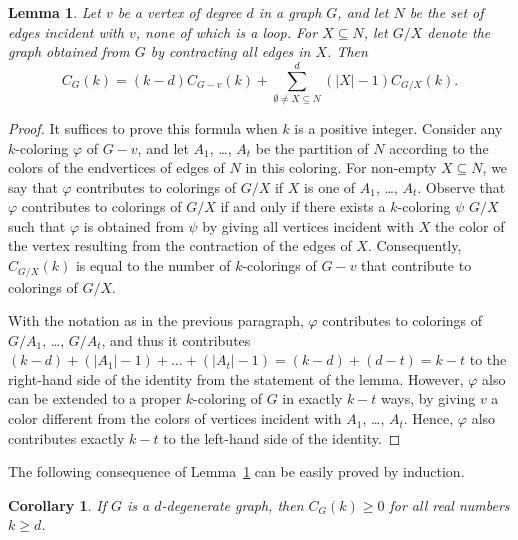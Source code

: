 \documentclass[12pt,twoside,openright,a4paper]{book}
\newtheorem{lemma}[theorem]{Lemma}
\newtheorem{corollary}[theorem]{Corollary}
\begin{document}
\begin{lemma}\label{lemma:chrpos}
Let $v$ be a vertex of degree $d$ in a graph $G$, and let $N$ be the set of edges incident with $v$,
none of which is a loop.  For $X\subseteq N$,
let $G/X$ denote the graph obtained from $G$ by contracting all edges in $X$.  Then
$$C_G(k)=(k-d)C_{G-v}(k)+\sum_{\emptyset\neq X\subseteq N}^d (|X|-1)C_{G/X}(k).$$
\end{lemma}
\begin{proof}
It suffices to prove this formula when $k$ is a positive integer.  Consider any $k$-coloring $\varphi$ of $G-v$,
and let $A_1$, \ldots, $A_t$ be the partition of $N$ according to the colors of the endvertices of edges of $N$ in this coloring.
For non-empty $X\subseteq N$, we say that $\varphi$ contributes to colorings of $G/X$ if $X$ is one of $A_1$, \ldots, $A_t$.
Observe that $\varphi$ contributes to colorings of $G/X$ if and only if there exists a $k$-coloring $\psi$ $G/X$
such that $\varphi$ is obtained from $\psi$ by giving all vertices incident with $X$ the color of the vertex resulting
from the contraction of the edges of $X$.  Consequently, $C_{G/X}(k)$ is equal to the number of $k$-colorings of $G-v$
that contribute to colorings of $G/X$.

With the notation as in the previous paragraph, $\varphi$ contributes to colorings of $G/A_1$, \ldots, $G/A_t$,
and thus it contributes $(k-d)+(|A_1|-1)+\ldots+(|A_t|-1)=(k-d)+(d-t)=k-t$ to the right-hand side of the identity
from the statement of the lemma.  However, $\varphi$ also can be extended to a proper $k$-coloring of $G$ in exactly
$k-t$ ways, by giving $v$ a color different from the colors of vertices incident with $A_1$, \ldots, $A_t$.
Hence, $\varphi$ also contributes exactly $k-t$ to the left-hand side of the identity.
\end{proof}

The following consequence of Lemma~\ref{lemma:chrpos} can be easily proved by induction.
\begin{corollary}\label{cor:nonnegdeg}
If $G$ is a $d$-degenerate graph, then $C_G(k)\ge 0$ for all real numbers $k\ge d$.
\end{corollary}
\end{document}
